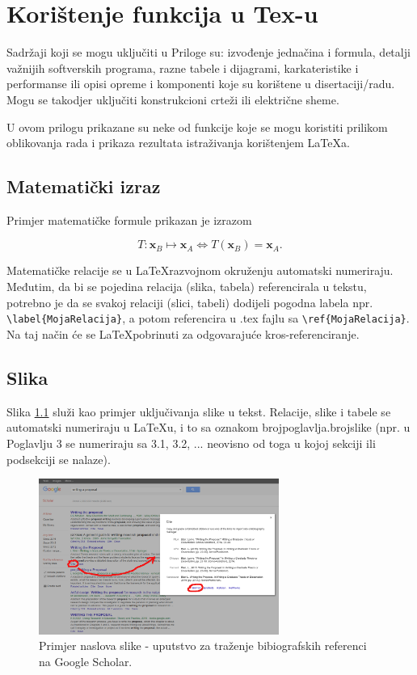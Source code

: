 \chapter{Korištenje funkcija u Tex-u}

Sadržaji koji se mogu uključiti u Priloge su: izvođenje jednačina i formula, detalji važnijih softverskih programa, razne tabele i dijagrami, karkateristike i performanse ili opisi opreme i komponenti koje su korištene u disertaciji/radu. Mogu se takodjer uključiti konstrukcioni crteži ili električne sheme.

U ovom prilogu prikazane su neke od funkcije koje se mogu koristiti prilikom oblikovanja rada i prikaza rezultata istraživanja korištenjem \LaTeX a. 


\section{Matematički izraz}


Primjer matematičke formule prikazan je izrazom

\begin{equation}
  T: \mathbf{x}_B \mapsto \mathbf{x}_A \Leftrightarrow T(\mathbf{x}_B) = \mathbf{x}_A.
  \label{eq:transformacija}
\end{equation}

Matematičke relacije se u \LaTeX razvojnom okruženju automatski numeriraju. Međutim, da bi se pojedina relacija (slika, tabela) referencirala u tekstu, potrebno je da se svakoj relaciji (slici, tabeli) dodijeli pogodna labela npr. {\tt {\textbackslash label\{MojaRelacija\}}}, a potom referencira u .tex fajlu sa {\tt {\textbackslash ref\{MojaRelacija\}}}. Na taj način će se \LaTeX pobrinuti za odgovarajuće kros-referenciranje.

\section{Slika}
Slika \ref{fig:Slika_citat} služi kao primjer uključivanja slike  u tekst. Relacije, slike i tabele se automatski numeriraju u \LaTeX u, i to sa oznakom brojpoglavlja.brojslike (npr. u Poglavlju 3 se numeriraju sa 3.1, 3.2, ... neovisno od toga u kojoj sekciji ili podsekciji se nalaze).

\begin{figure}
  \centering
  \includegraphics[width=0.7\textwidth]{SlikaCitat}
  \caption{Primjer naslova slike - uputstvo za traženje bibiografskih referenci na Google Scholar.}
  \label{fig:Slika_citat}
\end{figure}

